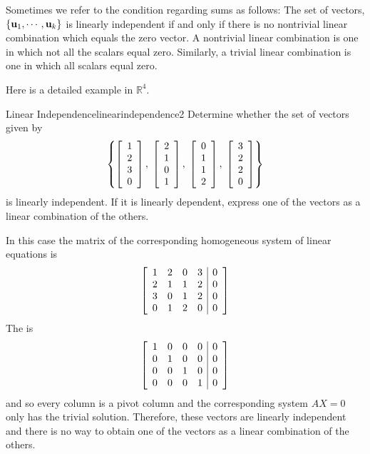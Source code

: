 Sometimes we refer to the condition regarding sums as follows: The set
of vectors, $\left\{ {\bf u}_{1},\cdots ,{\bf u}_{k}\right\} $ is
linearly independent if and only if there is no nontrivial linear
combination which equals the zero vector. A nontrivial linear
combination is one in which not all the scalars equal zero. Similarly,
a trivial linear combination is one in which all scalars equal zero.

Here is a detailed  example in  $\mathbb{R}^{4}$. 

\begin{example}{Linear Independence}{linearindependence2}
Determine whether the set of vectors given by  
\[ \left\{ \left[
\begin{array}{r}
1 \\
2 \\
3 \\
0
\end{array}
\right], \; \left[
\begin{array}{r}
2 \\
1 \\
0 \\
1
\end{array}
\right] , \; \left[
\begin{array}{r}
0 \\
1 \\
1 \\
2
\end{array}
\right]  , \; \left[
\begin{array}{r}
3 \\
2 \\
2 \\
0
\end{array}
\right] \right\} \]
is linearly independent. If it is linearly dependent,
express one of the vectors as a linear combination of the others.
\end{example}

\begin{solution}
In this case the matrix of the corresponding homogeneous system of linear equations  is 
\begin{equation*}
\left[ 
\begin{array}{rrrr|r}
1 & 2 & 0 & 3 & 0\\ 
2 & 1 & 1 & 2 & 0 \\ 
3 & 0 & 1 & 2 & 0 \\ 
0 & 1 & 2 & 0 & 0 
\end{array}
\right]
\end{equation*}
The {\rref} is 
\begin{equation*}
\left[ 
\begin{array}{rrrr|r}
1 & 0 & 0 & 0 & 0 \\ 
0 & 1 & 0 & 0 & 0 \\ 
0 & 0 & 1 & 0 & 0 \\ 
0 & 0 & 0 & 1 & 0 
\end{array}
\right]
\end{equation*}
and so every column is a pivot column and the corresponding system
$AX=0$ only has the trivial solution.  Therefore, these vectors are
linearly independent and there is no way to obtain one of the vectors
as a linear combination of the others.
\end{solution}

